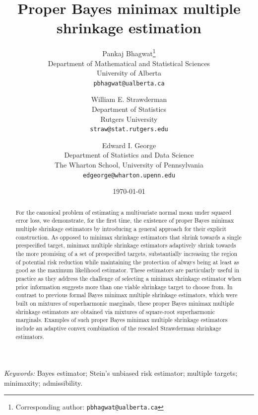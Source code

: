 \documentclass[11pt]{article}
\theoremstyle{definition}
\begin{document}
\title{Proper Bayes minimax multiple shrinkage estimation}
\author{ Pankaj Bhagwat\thanks{Corresponding author: \texttt{pbhagwat@ualberta.ca}}\\ Department of Mathematical and Statistical Sciences\\ University of Alberta \\ \texttt{pbhagwat@ualberta.ca} \and William E. Strawderman\\ Department of Statistics\\ Rutgers University\\ \texttt{straw@stat.rutgers.edu} \and Edward I. George\\ Department of Statistics and Data Science\\ The Wharton School, University of Pennsylvania\\ \texttt{edgeorge@wharton.upenn.edu} } 
\date{\today}

\maketitle

\begin{abstract}
For the canonical problem of estimating a multivariate normal mean under squared error loss, we demonstrate, for the first time, the existence of proper Bayes minimax multiple shrinkage estimators by introducing a general approach for their explicit construction.  As opposed to  minimax shrinkage estimators that shrink towards a single prespecified target, minimax multiple shrinkage estimators adaptively shrink towards the more promising of a set of prespecified targets, substantially increasing the region of potential risk reduction while maintaining the protection of always being at least as good as the maximum likelihood estimator. These estimators are particularly useful in practice as they address the challenge of selecting a minimax shrinkage estimator when prior information suggests more than one viable shrinkage target to choose from.  In contrast to previous formal Bayes minimax multiple shrinkage estimators, which were built on mixtures of superharmonic marginals, these proper Bayes minimax multiple shrinkage estimators are obtained via mixtures of square-root superharmonic marginals.   Examples of such proper Bayes minimax multiple shrinkage estimators include an adaptive convex combination of the rescaled Strawderman shrinkage estimators.
\end{abstract}
   
\smallskip
\noindent\textit{Keywords:} Bayes estimator; Stein's unbiased risk estimator; multiple targets; minimaxity; admissibility.
\end{document}
